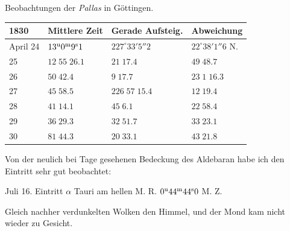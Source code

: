 \begin{center}
Beobachtungen der \emph{Pallas} in Göttingen.

\begin{tabular}{l|l|l|l}
1830 & Mittlere Zeit & Gerade Aufsteig. & Abweichung \\
\hline
April 24 & $13^{\rm u}0^{\rm m}9^{\rm s}1$ & $227^\circ33'5''2$ & $22^\circ38'1''6$ N. \\
\hfill 25 & $12\;55\;26.1$ & $21\;17.4$ & $49\;48.7$ \\
\hfill 26 & $50\;42.4$ & $9\;17.7$ & $23\;1\;16.3$ \\
\hfill 27 & $45\;58.5$ & $226\;57\;15.4$ & $12\;19.4$ \\
\hfill 28 & $41\;14.1$ & $45\;6.1$ & $22\;58.4$ \\
\hfill 29 & $36\;29.3$ & $32\;51.7$ & $33\;23.1$ \\
\hfill 30 & $81\;44.3$ & $20\;33.1$ & $43\;21.8$ \\
\end{tabular}
\end{center}

Von der neulich bei Tage gesehenen Bedeckung des Aldebaran habe ich den Eintritt sehr gut beobachtet:

\begin{center}Juli 16. Eintritt $\alpha$ Tauri am hellen M. R. $0^{\rm u}44^{\rm m}44^{\rm s}0$ M. Z.\end{center}

Gleich nachher verdunkelten Wolken den Himmel, und der Mond kam nicht wieder zu Gesicht.
